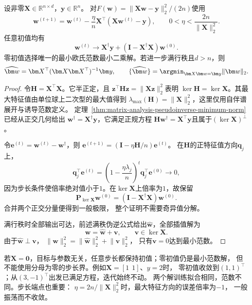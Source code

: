 \begin{theorem}[最小二乘梯度迭代的解选择]
\label{thm:gradient-descent-minimum-norm}
设非零$\bm X\in\mathbb R^{n\times d}$，$\bm y\in\mathbb R^n$。
对$F(\bm w)=\lVert\bm X\bm w-\bm y\rVert_2^2/(2n)$使用
\[
 \bm w^{(t+1)}
 =\bm w^{(t)}-\frac{\eta}{n}\bm X^\top(\bm X\bm w^{(t)}-\bm y),
 \qquad 0<\eta<\frac{2n}{\lVert\bm X\rVert_2^2}.
\]
任意初值均有
\begin{equation}
 \bm w^{(t)}\longrightarrow
 \bm X^\dagger\bm y+(\bm I-\bm X^\dagger\bm X)\bm w^{(0)}.
 \label{eq:matrix-analysis-gradient-limit}
\end{equation}
零初值选择唯一的最小欧氏范数最小二乘解。若进一步满行秩且$d>n$，则
\begin{equation}
 \widehat{\bm w}=\bm X^\top(\bm X\bm X^\top)^{-1}\bm y,\qquad
 \{\widehat{\bm w}\}=\argmin_{\bm X\bm w=\bm y}\lVert\bm w\rVert_2.
 \label{eq:minimum-norm-interpolator}
\end{equation}
\end{theorem}
\begin{proof}
令$\bm H=\bm X^\top\bm X$。它半正定，且
$\bm z^\top\bm H\bm z=\lVert\bm X\bm z\rVert_2^2$表明
$\ker\bm H=\ker\bm X$。其最大特征值由单位球上二次型的最大值得到
$\lambda_{\max}(\bm H)=\lVert\bm X\rVert_2^2$，这里仅用自伴谱展开与诱导范数定义。
定理~\ref{thm:matrix-analysis-pseudoinverse-minimum-norm}已经从正交几何给出
$\bm w^\dagger=\bm X^\dagger\bm y$，它满足正规方程
$\bm H\bm w^\dagger=\bm X^\top\bm y$且属于$(\ker\bm X)^\perp$。

令$\bm e^{(t)}=\bm w^{(t)}-\bm w^\dagger$，则
$\bm e^{(t+1)}=(\bm I-\eta\bm H/n)\bm e^{(t)}$。
在$\bm H$的正特征值方向$\bm q_j$上，
\[
 \bm q_j^\top\bm e^{(t)}
 =\left(1-\frac{\eta\lambda_j}{n}\right)^t
     \bm q_j^\top\bm e^{(0)}\longrightarrow0,
\]
因为步长条件使倍率绝对值小于$1$。在$\ker\bm X$上倍率为$1$，故保留
\[
 \bm P_{\ker\bm X}\bm w^{(0)}
 =(\bm I-\bm X^\dagger\bm X)\bm w^{(0)}.
\]
合并两个正交分量便得到一般极限，
整个证明不需要奇异值分解。

满行秩时全部输出可达，前述满秩伪逆公式给出$\widehat{\bm w}$，全部插值解为
\begin{equation}
 \bm w=\widehat{\bm w}+\bm v,\qquad \bm v\in\ker\bm X.
 \label{eq:interpolator-decomposition}
\end{equation}
由于$\widehat{\bm w}\perp\bm v$，
$\lVert\bm w\rVert_2^2=\lVert\widehat{\bm w}\rVert_2^2+\lVert\bm v\rVert_2^2$，
只有$\bm v=0$达到最小范数。
\end{proof}

若$\bm X=\bm0$，目标与参数无关，任意步长都保持初值；零初值仍是最小范数解，
但不能使用分母为零的步长界。例如$\bm X=[1\ \ 1]$、$y=2$时，
零初值收敛到$(1,1)^\top$；从$(3,-1)^\top$出发已满足方程，迭代始终不动。
两个解训练拟合相同，范数不同。步长端点也重要：
$\eta=2n/\lVert\bm X\rVert_2^2$时，最大特征方向的误差倍率为$-1$，
一般振荡而不收敛。

